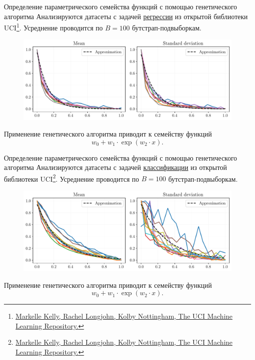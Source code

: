 \documentclass[10pt]{beamer}
\begin{document}
\begin{frame}{Определение параметрического семейства функций с помощью генетического алгоритма}
    Анализируются датасеты с задачей \underline{регрессии} из открытой библиотеки UCI\footnote{\href{https://archive.ics.uci.edu}{Markelle Kelly, Rachel Longjohn, Kolby Nottingham, The UCI Machine Learning Repository.}}. Усреднение проводится по $B=100$ бутстрап-подвыборкам.
    \vfill
    \begin{figure}[h!]
        \centering
        \includegraphics[width=\textwidth]{paper/figures/datasets_regression.pdf}
    \end{figure}
    \vfill
    Применение генетического алгоритма приводит к семейству функций
    \[ w_0 + w_1 \cdot \exp(w_2 \cdot x). \]
\end{frame}
\begin{frame}{Определение параметрического семейства функций с помощью генетического алгоритма}
    Анализируются датасеты с задачей \underline{классификации} из открытой библиотеки UCI\footnote{\href{https://archive.ics.uci.edu}{Markelle Kelly, Rachel Longjohn, Kolby Nottingham, The UCI Machine Learning Repository.}}. Усреднение проводится по $B=100$ бутстрап-подвыборкам.
    \vfill
    \begin{figure}[h!]
        \centering
        \includegraphics[width=\textwidth]{paper/figures/datasets_classification.pdf}
    \end{figure}
    \vfill
    Применение генетического алгоритма приводит к семейству функций
    \[ w_0 + w_1 \cdot \exp(w_2 \cdot x). \]
\end{frame}
\end{document}
